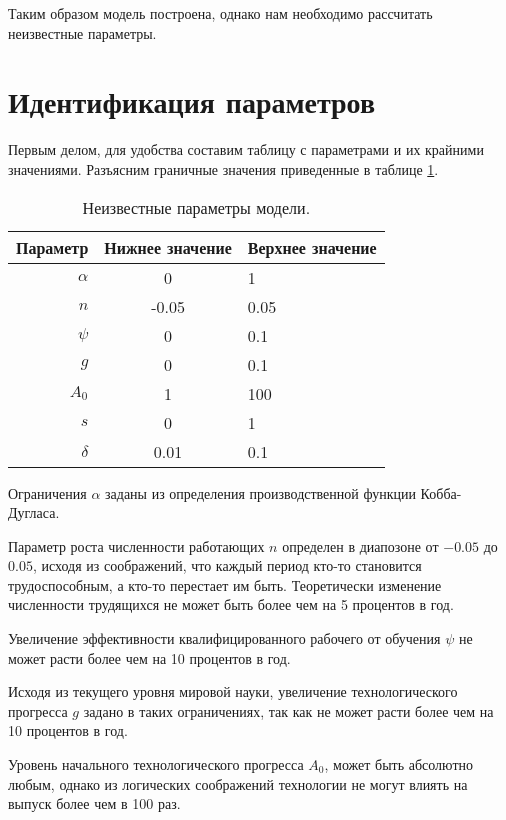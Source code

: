Таким образом модель построена, однако нам необходимо рассчитать неизвестные параметры.

\section{Идентификация параметров}

Первым делом, для удобства составим таблицу с параметрами и их крайними значениями.
Разъясним граничные значения приведенные в таблице \ref{tab:parameters}.
\begin{table}[ht]
	\centering
	\caption{Неизвестные параметры модели.}
	\label{tab:parameters}
	\begin{tabular}{|r|c|l|}
	\hline
	Параметр & Нижнее значение & Верхнее значение \\ \hline
	$\alpha$ &      0          &      1           \\
	$n$      &      -0.05      &      0.05        \\
	$\psi$   &      0          &      0.1         \\
	$g$      &      0          &      0.1         \\
	$A_0$    &      1          &      100         \\
	$s$      &      0          &      1           \\
	$\delta$ &      0.01       &    0.1           \\ \hline
	\end{tabular}%
\end{table}

Ограничения $\alpha$ заданы из определения производственной функции Кобба-Дугласа.

Параметр роста численности работающих $n$ определен в диапозоне от $-0.05$ до $0.05$, исходя из соображений, что каждый период кто-то становится трудоспособным, а кто-то перестает им быть.
Теоретически изменение численности трудящихся не может быть более чем на 5 процентов в год.

Увеличение эффективности квалифицированного рабочего от обучения $\psi$ не может расти более чем на 10 процентов в год.

Исходя из текущего уровня мировой науки, увеличение технологического прогресса $g$ задано в таких ограничениях, так как не может расти более чем на 10 процентов в год.

Уровень начального технологического прогресса $A_0$, может быть абсолютно любым, однако из логических соображений технологии не могут влиять на выпуск более чем в 100 раз.

